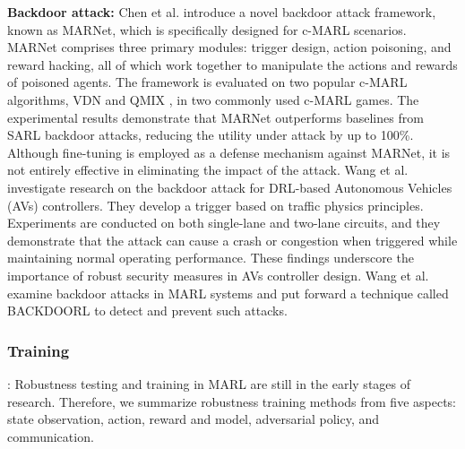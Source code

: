 \documentclass[acmsmall]{acmart}
\begin{document}
\textbf{Backdoor attack: } Chen et al. \cite{chen2022marnet} introduce a novel backdoor attack framework, known as MARNet, which is specifically designed for c-MARL scenarios. MARNet comprises three primary modules: trigger design, action poisoning, and reward hacking, all of which work together to manipulate the actions and rewards of poisoned agents. The framework is evaluated on two popular c-MARL algorithms, VDN \cite{vdn} and QMIX \cite{qmix}, in two commonly used c-MARL games. The experimental results demonstrate that MARNet outperforms baselines from SARL backdoor attacks, reducing the utility under attack by up to 100\%. Although fine-tuning is employed as a defense mechanism against MARNet, it is not entirely effective in eliminating the impact of the attack.
Wang et al. \cite{9541185} investigate research on the backdoor attack for DRL-based Autonomous Vehicles (AVs) controllers. They develop a trigger based on traffic physics principles. Experiments are conducted on both single-lane and two-lane circuits, and they demonstrate that the attack can cause a crash or congestion when triggered while maintaining normal operating performance. These findings underscore the importance of robust security measures in AVs controller design.
Wang et al. \cite{wang2021backdoorl} examine backdoor attacks in MARL systems and put forward a technique called BACKDOORL to detect and prevent such attacks.

\subsubsection{Training}: Robustness testing and training in MARL are still in the early stages of research. Therefore, we summarize robustness training methods from five aspects: state observation, action, reward and model, adversarial policy, and communication.
\end{document}
